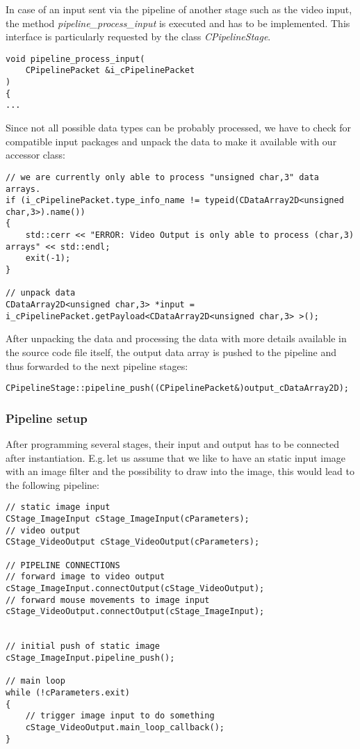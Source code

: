 \noindent
In case of an input sent via the pipeline of another stage such as the video
input, the method \textit{pipeline\_process\_input} is executed and has to be
implemented. This interface is particularly requested by the class
\textit{CPipelineStage}.

\begin{lstlisting}
void pipeline_process_input(
	CPipelinePacket &i_cPipelinePacket
)
{
...
\end{lstlisting}

\noindent
Since not all possible data types can be probably processed, we have to check
for compatible input packages and unpack the data to make it available with our
accessor class:
\begin{lstlisting}
// we are currently only able to process "unsigned char,3" data arrays.
if (i_cPipelinePacket.type_info_name != typeid(CDataArray2D<unsigned char,3>).name())
{
	std::cerr << "ERROR: Video Output is only able to process (char,3) arrays" << std::endl;
	exit(-1);
}

// unpack data
CDataArray2D<unsigned char,3> *input = i_cPipelinePacket.getPayload<CDataArray2D<unsigned char,3> >();
\end{lstlisting}

\noindent
After unpacking the data and processing the data with more details available in
the source code file itself, the output data array is pushed to the pipeline and
thus forwarded to the next pipeline stages:
\begin{lstlisting}
CPipelineStage::pipeline_push((CPipelinePacket&)output_cDataArray2D);
\end{lstlisting}

%
\subsubsection{Pipeline setup}
After programming several stages, their input and output has to be
connected after instantiation.
E.g.\,let us assume that we like to have an static input image with an image
filter and the possibility to draw into the image, this would lead to the
following pipeline:

\begin{lstlisting}
// static image input
CStage_ImageInput cStage_ImageInput(cParameters);
// video output
CStage_VideoOutput cStage_VideoOutput(cParameters);

// PIPELINE CONNECTIONS
// forward image to video output
cStage_ImageInput.connectOutput(cStage_VideoOutput);
// forward mouse movements to image input
cStage_VideoOutput.connectOutput(cStage_ImageInput);


// initial push of static image
cStage_ImageInput.pipeline_push();

// main loop
while (!cParameters.exit)
{
	// trigger image input to do something
	cStage_VideoOutput.main_loop_callback();
}
\end{lstlisting}

